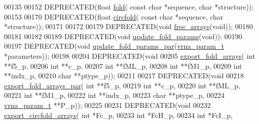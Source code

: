 \begin{DoxyCode}
00135 
00152 DEPRECATED(\textcolor{keywordtype}{float} \hyperlink{group__mfe__fold__single_gaadafcb0f140795ae62e5ca027e335a9b}{fold}( \textcolor{keyword}{const} \textcolor{keywordtype}{char} *sequence, \textcolor{keywordtype}{char} *structure));
00153 
00170 DEPRECATED(\textcolor{keywordtype}{float} \hyperlink{group__mfe__fold__single_ga4ac63ab3e8d9a80ced28b8052d94e423}{circfold}( \textcolor{keyword}{const} \textcolor{keywordtype}{char} *sequence, \textcolor{keywordtype}{char} *structure));
00171 
00172 
00179 DEPRECATED(\textcolor{keywordtype}{void} \hyperlink{group__mfe__fold__single_ga107fdfe5fd641868156bfd849f6866c7}{free\_arrays}(\textcolor{keywordtype}{void}));
00180 
00181 
00182 
00189 DEPRECATED(\textcolor{keywordtype}{void} \hyperlink{group__mfe__fold__single_ga41bf8f6fa15b94471f7095cad9f0ccf3}{update\_fold\_params}(\textcolor{keywordtype}{void}));
00190 
00197 DEPRECATED(\textcolor{keywordtype}{void} \hyperlink{group__mfe__fold__single_gae66dc422efb8f5d56717d92d6002a9f8}{update\_fold\_params\_par}(\hyperlink{group__energy__parameters_structvrna__param__s}{vrna\_param\_t} *parameters));
00198 
00204 DEPRECATED(\textcolor{keywordtype}{void}
00205 \hyperlink{group__mfe__fold__single_ga99641b8dbb40891da5490d3cc271e607}{export\_fold\_arrays}( \textcolor{keywordtype}{int} **f5\_p,
00206                     \textcolor{keywordtype}{int} **c\_p,
00207                     \textcolor{keywordtype}{int} **fML\_p,
00208                     \textcolor{keywordtype}{int} **fM1\_p,
00209                     \textcolor{keywordtype}{int} **indx\_p,
00210                     \textcolor{keywordtype}{char} **ptype\_p));
00211 
00217 DEPRECATED(\textcolor{keywordtype}{void}
00218 \hyperlink{group__mfe__fold__single_ga6606ec0ec964ea506fdadb997a1a5328}{export\_fold\_arrays\_par}( \textcolor{keywordtype}{int} **f5\_p,
00219                         \textcolor{keywordtype}{int} **c\_p,
00220                         \textcolor{keywordtype}{int} **fML\_p,
00221                         \textcolor{keywordtype}{int} **fM1\_p,
00222                         \textcolor{keywordtype}{int} **indx\_p,
00223                         \textcolor{keywordtype}{char} **ptype\_p,
00224                         \hyperlink{group__energy__parameters_structvrna__param__s}{vrna\_param\_t} **P\_p));
00225 
00231 DEPRECATED(\textcolor{keywordtype}{void}
00232 \hyperlink{group__mfe__fold__single_ga04d5d639fd4473ca766436a9bae5665c}{export\_circfold\_arrays}( \textcolor{keywordtype}{int} *Fc\_p,
00233                         \textcolor{keywordtype}{int} *FcH\_p,
00234                         \textcolor{keywordtype}{int} *FcI\_p,

\end{DoxyCode}
